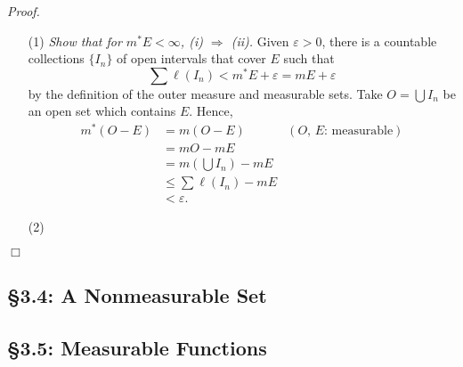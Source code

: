 \documentclass{article}
\begin{document}
\emph{Proof.}
\begin{enumerate}
\item[(1)]
  \emph{Show that for $m^{*}E < \infty$, (i) $\Rightarrow$ (ii).}
  Given $\varepsilon > 0$,
  there is a countable collections $\{ I_n \}$ of open intervals that cover $E$
  such that
  \[
    \sum \ell(I_n) < m^{*}E + \varepsilon = mE + \varepsilon
  \]
  by the definition of the outer measure and measurable sets.
  Take $O = \bigcup I_n$ be an open set which contains $E$.
  Hence,
  \begin{align*}
    m^{*}(O - E)
    &= m(O - E)
      &(\text{$O$, $E$: measurable}) \\
    &= mO - mE \\
    &= m\left( \bigcup I_n \right) - mE \\
    &\leq \sum \ell(I_n) - mE \\
    &< \varepsilon.
  \end{align*}

\item[(2)]

\end{enumerate}
$\Box$\\







\subsection*{\S 3.4: A Nonmeasurable Set \\}






\subsection*{\S 3.5: Measurable Functions \\}



\end{document}

